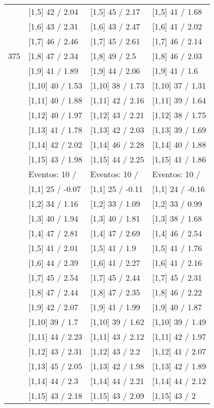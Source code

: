 \begin{table}
\begin{tabular}[t]{llll}
 & {}[1,5] 42  / 2.04 & {}[1,5] 45  / 2.17 & {}[1,5] 41  / 1.68\\
 & {}[1,6] 43  / 2.31 & {}[1,6] 43  / 2.47 & {}[1,6] 41  / 2.02\\
 & {}[1,7] 46  / 2.46 & {}[1,7] 45  / 2.61 & {}[1,7] 46  / 2.14\\
375 & {}[1,8] 47  / 2.34 & {}[1,8] 49  / 2.5 & {}[1,8] 46  / 2.03\\
\addlinespace
 & {}[1,9] 41  / 1.89 & {}[1,9] 44  / 2.06 & {}[1,9] 41  / 1.6\\
 & {}[1,10] 40  / 1.53 & {}[1,10] 38  / 1.73 & {}[1,10] 37  / 1.31\\
 & {}[1,11] 40  / 1.88 & {}[1,11] 42  / 2.16 & {}[1,11] 39  / 1.64\\
 & {}[1,12] 40  / 1.97 & {}[1,12] 43  / 2.21 & {}[1,12] 38  / 1.75\\
 & {}[1,13] 41  / 1.78 & {}[1,13] 42  / 2.03 & {}[1,13] 39  / 1.69\\
\addlinespace
 & {}[1,14] 42  / 2.02 & {}[1,14] 46  / 2.28 & {}[1,14] 40  / 1.88\\
 & {}[1,15] 43  / 1.98 & {}[1,15] 44  / 2.25 & {}[1,15] 41  / 1.86\\
 & Eventos:  10 / & Eventos:  10 / & Eventos:  10 /\\
 & {}[1,1] 25  / -0.07 & {}[1,1] 25  / -0.11 & {}[1,1] 24  / -0.16\\
 & {}[1,2] 34  / 1.16 & {}[1,2] 33  / 1.09 & {}[1,2] 33  / 0.99\\
\addlinespace
 & {}[1,3] 40  / 1.94 & {}[1,3] 40  / 1.81 & {}[1,3] 38  / 1.68\\
 & {}[1,4] 47  / 2.81 & {}[1,4] 47  / 2.69 & {}[1,4] 46  / 2.54\\
 & {}[1,5] 41  / 2.01 & {}[1,5] 41  / 1.9 & {}[1,5] 41  / 1.76\\
 & {}[1,6] 44  / 2.39 & {}[1,6] 41  / 2.27 & {}[1,6] 41  / 2.16\\
 & {}[1,7] 45  / 2.54 & {}[1,7] 45  / 2.44 & {}[1,7] 45  / 2.31\\
\addlinespace
500 & {}[1,8] 47  / 2.44 & {}[1,8] 47  / 2.35 & {}[1,8] 46  / 2.22\\
 & {}[1,9] 42  / 2.07 & {}[1,9] 41  / 1.99 & {}[1,9] 40  / 1.87\\
 & {}[1,10] 39  / 1.7 & {}[1,10] 39  / 1.62 & {}[1,10] 39  / 1.49\\
 & {}[1,11] 44  / 2.23 & {}[1,11] 43  / 2.12 & {}[1,11] 42  / 1.97\\
 & {}[1,12] 43  / 2.31 & {}[1,12] 43  / 2.2 & {}[1,12] 41  / 2.07\\
\addlinespace
 & {}[1,13] 45  / 2.05 & {}[1,13] 42  / 1.98 & {}[1,13] 42  / 1.89\\
 & {}[1,14] 44  / 2.3 & {}[1,14] 44  / 2.21 & {}[1,14] 44  / 2.12\\
 & {}[1,15] 43  / 2.18 & {}[1,15] 43  / 2.09 & {}[1,15] 43  / 2\\
\bottomrule
\end{tabular}
\end{table}
